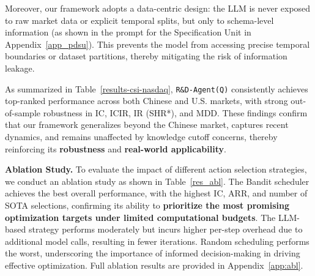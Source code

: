 \documentclass{article}
\newcommand{\name}{\texttt{R\&D-Agent(Q)}}
\begin{document}
Moreover, our framework adopts a data-centric design: the LLM is never exposed to raw market data or explicit temporal splits, but only to schema-level information (as shown in the prompt for the Specification Unit in Appendix~\ref{app_pdsu}).
This prevents the model from accessing precise temporal boundaries or dataset partitions, thereby mitigating the risk of information leakage.

As summarized in Table~\ref{results-csi-nasdaq}, \texttt{\name} consistently achieves top-ranked performance across both Chinese and U.S. markets, with strong out-of-sample robustness in IC, ICIR, IR (SHR*), and MDD. 
These findings confirm that our framework generalizes beyond the Chinese market, captures recent dynamics, and remains unaffected by knowledge cutoff concerns, thereby reinforcing its \textbf{robustness} and \textbf{real-world applicability}.


\textbf{ Ablation Study.}
To evaluate the impact of different action selection strategies, we conduct an ablation study as shown in Table~\ref{res_abl}. The Bandit scheduler achieves the best overall performance, with the highest IC, ARR, and number of SOTA selections, confirming its ability to \textbf{prioritize the most promising optimization targets under limited computational budgets}.
The LLM-based strategy performs moderately but incurs higher per-step overhead due to additional model calls, resulting in fewer iterations.
Random scheduling performs the worst, underscoring the importance of informed decision-making in driving effective optimization.
Full ablation results are provided in Appendix~\ref{app:abl}.
\end{document}
